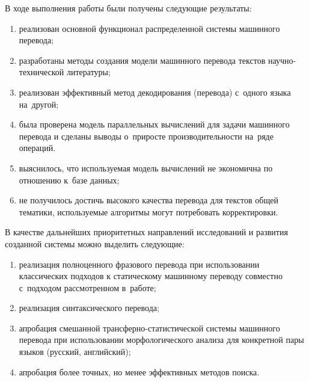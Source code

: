 

В ходе выполнения работы были получены следующие результаты:

{\renewcommand{\labelenumi}{\alph{enumi})}
	\begin{enumerate}
		\item реализован основной функционал распределенной системы машинного перевода;
		\item разработаны методы создания модели машинного перевода текстов научно-технической литературы;
		\item реализован эффективный метод декодирования (перевода) с~одного языка на~другой;
		\item была проверена модель параллельных вычислений для задачи машинного перевода
			и сделаны выводы о~приросте производительности на~ряде операций. 
		\item выяснилось, что используемая модель вычислений не экономична 
			по отношению к~базе данных;
		\item не получилось достичь высокого качества перевода для текстов общей тематики, 
			используемые алгоритмы могут потребовать корректировки.
	\end{enumerate}
}
В качестве дальнейших приоритетных направлений исследований 
и развития созданной системы можно выделить следующие:
{\renewcommand{\labelenumi}{\alph{enumi})}
	\begin{enumerate}
		\item реализация полноценного фразового перевода
			при использовании классических подходов 
				к статическому машинному переводу совместно с~подходом рассмотренном в~работе;
		\item реализация синтаксического перевода;
		\item апробация смешанной трансферно-статистической системы машинного перевода 
			при использовании морфологического анализа для конкретной пары языков (русский, английский);
		\item апробация более точных, но менее эффективных методов поиска.
	\end{enumerate}
}
